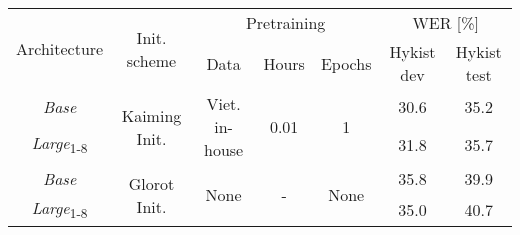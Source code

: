 \begin{table}[!h]
\captionsetup{font=Large}
\centering
\begin{adjustbox}{width=\columnwidth,center}
\begin{tabular}{|c|c|c|c|c|c|c|} 
\hline
\multirow{2}{*}{Architecture} & \multirow{2}{*}{Init. scheme}  & \multicolumn{3}{c|}{Pretraining}                                                & \multicolumn{2}{c|}{WER [\%]}  \\ 
\cline{3-7}
                              &                                & Data                    & Hours                 & Epochs                & Hykist dev & Hykist test       \\ 
\hline
\textit{Base}                 & \multirow{2}{*}{Kaiming Init.} & \multirow{2}{*}{Viet. in-house} & \multirow{2}{*}{0.01} & \multirow{2}{*}{1}    & 30.6       & 35.2              \\ 
\cline{1-1}\cline{6-7}
\textit{Large}\textsubscript{1-8}             &                                &                                 &                       &                       & 31.8       & 35.7              \\ 
\hline
\textit{Base}                 & \multirow{2}{*}{Glorot Init.}  & \multirow{2}{*}{None}           & \multirow{2}{*}{-}    & \multirow{2}{*}{None} & 35.8       & 39.9              \\ 
\cline{1-1}\cline{6-7}
\textit{Large}\textsubscript{1-8}             &                                &                                 &                       &                       & 35.0       & 40.7              \\
\hline
\end{tabular}
\end{adjustbox}
\caption{}
\label{table:encoder_compare_shortPretrain}
\end{table}